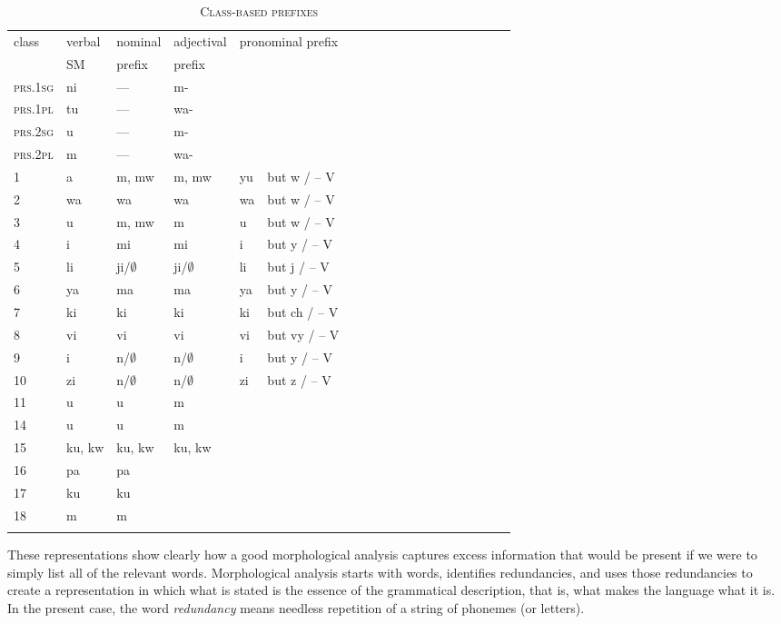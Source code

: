 \documentclass[output=paper,colorlinks,citecolor=brown,
]{langscibook}
\begin{document}
\begin{table}
\begin{tabular}{lllllllllllllllllll}\lsptoprule
class & verbal & nominal & adjectival   & \multicolumn{2}{l}{pronominal prefix} \\
&SM & prefix & prefix\\ \midrule
\textsc{prs.1sg} & ni & --- & m- \\
\textsc{prs.1pl} & tu &--- & wa- \\
\textsc{prs.2sg} & u &--- &m-  \\
\textsc{prs.2pl} & m &---& wa- \\
1 & a & m, mw  & m, mw & yu & but w / -- V \\
2 & wa & wa & wa & wa & but w / -- V\\
3 & u & m, mw & m & u&  but w / -- V \\
4 & i & mi & mi & i& but y / -- V  \\
5 & li & ji/$\emptyset$ & ji/$\emptyset$ & li & but j / -- V  \\
6 & ya & ma & ma & ya & but y / -- V  \\
7 & ki &ki & ki & ki & but ch / -- V \\
8 & vi & vi & vi & vi & but vy / -- V  \\
9 & i & n/$\emptyset$ & n/$\emptyset$  & i & but y / -- V  \\
10 & zi & n/$\emptyset$ & n/$\emptyset$  & zi & but z / -- V    \\
11 & u & u  & m  \\
14 & u & u & m \\
15 & ku, kw & ku, kw  & ku, kw\\ 
16 & pa & pa\\
17 & ku & ku \\
18 & m & m \\
\lspbottomrule
\end{tabular}
\caption{\textsc{Class-based prefixes}}
\label{class-based-system}
\end{table}
 
  
These representations show clearly how a good morphological analysis captures excess information that would be present if we were to simply list all of the relevant words. Morphological analysis starts with words, identifies redundancies, and uses those redundancies to create a representation in which what is stated is the essence of the grammatical description, that is, what makes the language what it is. In the present case, the word \textit{redundancy} means needless repetition of a string of phonemes (or letters).
\end{document}
